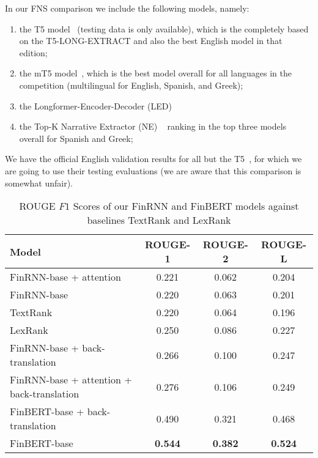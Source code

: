 In our FNS comparison we include the following models, namely:
\begin{enumerate}
    \item the T5 model~\cite{el-haj-etal-2022-financial} (testing data is only available), which is the completely based on the T5-LONG-EXTRACT and also the best English model in that edition;
    \item the mT5 model~\cite{foroutan-etal-2022-multilingual}, which is the best model overall for all languages in the competition (multilingual for English, Spanish, and Greek);
    \item the Longformer-Encoder-Decoder (LED)~\cite{khanna-etal-2022-transformer}
    \item the Top-K Narrative Extractor (NE) ~\cite{shukla-etal-2022-dimsum}  ranking in the top three models overall for Spanish and Greek;
\end{enumerate}
We have the official English validation results for all but the T5~\cite{el-haj-etal-2022-financial}, for which we are going to use their testing evaluations (we are aware that this comparison is somewhat unfair).

\begin{table}[ht]
    \centering
    \begin{tabular}{lccc}
        \toprule
        \textbf{Model} & \textbf{ROUGE-1} & \textbf{ROUGE-2} & \textbf{ROUGE-L} \\
        \midrule
            FinRNN-base + attention & 0.221 & 0.062 & 0.204 \\
            FinRNN-base & 0.220 & 0.063 & 0.201 \\
            TextRank ~\cite{mihalcea-tarau-2004-textrank} & 0.220 & 0.064 & 0.196 \\
            LexRank ~\cite{Erkan2004LexRankGC} & 0.250 & 0.086 & 0.227 \\
        \midrule
            FinRNN-base + back-translation & 0.266 & 0.100 & 0.247 \\
            FinRNN-base + attention + back-translation & 0.276 & 0.106 & 0.249 \\
            FinBERT-base + back-translation & 0.490 & 0.321 & 0.468 \\
            FinBERT-base & \textbf{0.544} & \textbf{0.382} & \textbf{0.524} \\
        \bottomrule
    \end{tabular}\caption{ROUGE $F1$ Scores of our FinRNN and FinBERT models against baselines TextRank and LexRank}
    \label{tab:rouge_performance_validation}
\end{table}

